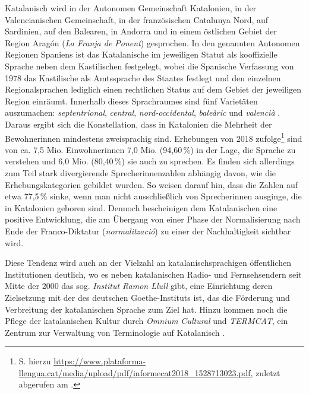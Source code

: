 Katalanisch wird in der Autonomen Gemeinschaft Katalonien, in der Valencianischen Gemeinschaft, in der französischen Catalunya Nord, auf Sardinien, auf den Balearen, in Andorra und in einem östlichen Gebiet der Region Aragón (\emph{La Franja de Ponent}) gesprochen. In den genannten Autonomen Regionen Spaniens ist das Katalanische im jeweiligen Statut als kooffizielle Sprache neben dem Kastilischen festgelegt, wobei die Spanische Verfassung von 1978 das Kastilische als Amtssprache des Staates festlegt und den einzelnen Regionalsprachen lediglich einen rechtlichen Status auf dem Gebiet der jeweiligen Region einräumt. Innerhalb dieses Sprachraumes sind fünf Varietäten auszumachen: \emph{septentrional}, \emph{central}, \emph{nord-occidental}, \emph{baleàric} und \emph{valencià} \citep[9]{moreno_llengua_2012}. Daraus ergibt sich die Konstellation, dass in Katalonien die Mehrheit der Bewohner{\textperiodcentered}innen mindestens zweisprachig sind. Erhebungen von 2018 zufolge\footnote{S. hierzu \url{https://www.plataforma-llengua.cat/media/upload/pdf/informecat2018_1528713023.pdf}, zuletzt abgerufen am \datum{}.} sind von ca. 7,5 Mio. Einwohner{\textperiodcentered}innen 7,0 Mio. (94,60\,\%) in der Lage, die Sprache zu verstehen und 6,0 Mio. (80,40\,\%) sie auch zu sprechen. Es finden sich allerdings zum Teil stark divergierende Sprecher{\textperiodcentered}innenzahlen abhängig davon, wie die Erhebungskategorien gebildet wurden. So weisen \citet[9]{moreno_llengua_2012} darauf hin, dass die Zahlen auf etwa 77,5\,\% sinke, wenn man nicht ausschließlich von Sprecher{\textperiodcentered}innen ausginge, die in Katalonien geboren sind. Dennoch bescheinigen \citet[527]{casesnoves_primary_2019} dem Katalanischen eine positive Entwicklung, die am Übergang von einer Phase der Normalisierung nach Ende der Franco-Diktatur (\emph{normalització}) zu einer der Nachhaltigkeit sichtbar wird.

Diese Tendenz wird auch an der Vielzahl an katalanischsprachigen öffentlichen Institutionen deutlich, wo es neben katalanischen Radio- und Fernsehsendern seit Mitte der 2000 das sog. \emph{Institut Ramon Llull} gibt, eine Einrichtung deren Zielsetzung mit der des deutschen Goethe-Instituts ist, das die Förderung und Verbreitung der katalanischen Sprache zum Ziel hat. Hinzu kommen noch die Pflege der katalanischen Kultur durch \emph{Omnium Cultural} und \emph{TERMCAT}, ein Zentrum zur Verwaltung von Terminologie auf Katalanisch \citep[10]{moreno_llengua_2012}.

